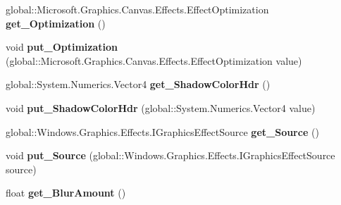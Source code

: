 \begin{DoxyCompactItemize}
global\+::\+Microsoft.\+Graphics.\+Canvas.\+Effects.\+Effect\+Optimization {\bfseries get\+\_\+\+Optimization} ()
\item 
\mbox{\label{interface_microsoft_1_1_graphics_1_1_canvas_1_1_effects_1_1_i_shadow_effect_a47609594c0d8db1c5d91cfbd3413feba}} 
void {\bfseries put\+\_\+\+Optimization} (global\+::\+Microsoft.\+Graphics.\+Canvas.\+Effects.\+Effect\+Optimization value)
\item 
\mbox{\label{interface_microsoft_1_1_graphics_1_1_canvas_1_1_effects_1_1_i_shadow_effect_aac90c7161656038d0dfc1177b36c6c66}} 
global\+::\+System.\+Numerics.\+Vector4 {\bfseries get\+\_\+\+Shadow\+Color\+Hdr} ()
\item 
\mbox{\label{interface_microsoft_1_1_graphics_1_1_canvas_1_1_effects_1_1_i_shadow_effect_ae97d7959236ba2f08e531718a11a4983}} 
void {\bfseries put\+\_\+\+Shadow\+Color\+Hdr} (global\+::\+System.\+Numerics.\+Vector4 value)
\item 
\mbox{\label{interface_microsoft_1_1_graphics_1_1_canvas_1_1_effects_1_1_i_shadow_effect_a344919ac690c7502e2a1c28ee4f5966f}} 
global\+::\+Windows.\+Graphics.\+Effects.\+I\+Graphics\+Effect\+Source {\bfseries get\+\_\+\+Source} ()
\item 
\mbox{\label{interface_microsoft_1_1_graphics_1_1_canvas_1_1_effects_1_1_i_shadow_effect_acea577b60a4e50cef4fea7cdea1764f9}} 
void {\bfseries put\+\_\+\+Source} (global\+::\+Windows.\+Graphics.\+Effects.\+I\+Graphics\+Effect\+Source source)
\item 
\mbox{\label{interface_microsoft_1_1_graphics_1_1_canvas_1_1_effects_1_1_i_shadow_effect_a49b43e4fdcdcf0af12d8a5e4005a11e8}} 
float {\bfseries get\+\_\+\+Blur\+Amount} ()
\item 
\mbox{\label{interface_microsoft_1_1_graphics_1_1_canvas_1_1_effects_1_1_i_shadow_effect_a9d0a51d4856757395eab29060b840a88}} 

\end{DoxyCompactItemize}
